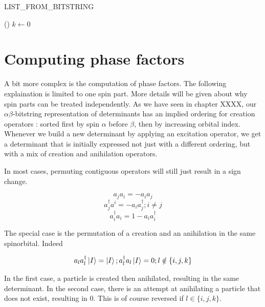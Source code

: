 \begin{algorithm}[h!]
	\caption{LIST\_FROM\_BITSTRING}
	\label{alg:LIST_FROM_BITSTRING}
	
	\Fn(){}{
		$k \gets 0$ \;
		}
		
\end{algorithm}



\section{Computing phase factors}



A bit more complex is the computation of phase factors. The following explaination is limited to one spin part. More details will be given about why spin parts can be treated independently.
As we have seen in chapter XXXX, our $\alpha \beta$-bitstring representation of determinants has an implied ordering for creation operators : sorted first by spin $\alpha$ before $\beta$, then by increasing orbital index.
Whenever we build a new determinant by applying an excitation operator, we get a determinant that is initially expressed not just with a different ordering, but with a mix of creation and anihilation operators.

In most cases, permuting contiguous operators will still just result in a sign change.

$$a_j a_i = -a_i a_j$$
$$a^\dagger_j a^i = -a_i a^\dagger_j ; i \neq j$$
$$a^\dagger_i a_i = 1-a_i a^\dagger_i$$

The special case is the permutation of a creation and an anihilation in the same spinorbital. Indeed

$$a_l a^\dagger_l \ket I  = \ket I ; a^\dagger_l a_l \ket I = 0 ; l \notin \{i,j,k\}$$

In the first case, a particle is created then anihilated, resulting in the same determinant. In the second case, there is an attempt at anihilating a particle that does not exist, resulting in $0$. This is of course reversed if $l \in \{i,j,k\}$.


